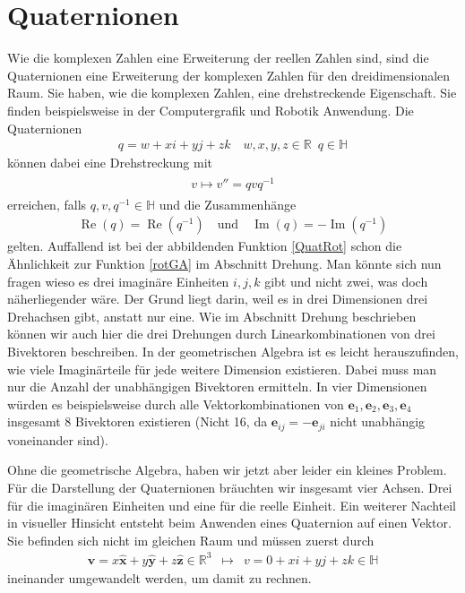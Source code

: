 %
%
%
\section{Quaternionen}

Wie die komplexen Zahlen eine Erweiterung der reellen Zahlen sind, sind die Quaternionen eine Erweiterung der komplexen Zahlen für den dreidimensionalen Raum. Sie haben, wie die komplexen Zahlen, eine drehstreckende Eigenschaft.
Sie finden beispielsweise in der Computergrafik und Robotik Anwendung.
Die Quaternionen
\begin{align}
q = w + xi + yj + zk \quad w,x,y,z \in \mathbb{R}\enspace q \in \mathbb{H}
\end{align}
können dabei eine Drehstreckung mit
\begin{align} \label{QuatRot}
\begin{split} 
v \mapsto v'' = qvq^{-1}
\end{split}
\end{align}
erreichen, falls $q,v,q^{-1} \in \mathbb{H}$ und die Zusammenhänge
\begin{align}
\operatorname{Re}(q) = \operatorname{Re}(q^{-1})\quad\text{und}\quad \operatorname{Im}(q) = -\operatorname{Im}(q^{-1})
\end{align}
gelten. Auffallend ist bei der abbildenden Funktion \eqref{QuatRot} schon die Ähnlichkeit zur Funktion \eqref{rotGA} im Abschnitt Drehung. Man könnte sich nun fragen wieso es drei imaginäre Einheiten $i,j,k$ gibt und nicht zwei, was doch näherliegender wäre. Der Grund liegt darin, weil es in drei Dimensionen drei Drehachsen gibt, anstatt nur eine. Wie im Abschnitt Drehung beschrieben können wir auch hier die drei Drehungen durch Linearkombinationen von drei Bivektoren beschreiben. In der geometrischen Algebra ist es leicht herauszufinden, wie viele Imaginärteile für jede weitere Dimension existieren. Dabei muss man nur die Anzahl der unabhängigen Bivektoren ermitteln. In vier Dimensionen würden es beispielsweise durch alle Vektorkombinationen von $\mathbf{e}_1, \mathbf{e}_2,\mathbf{e}_3, \mathbf{e}_4$ insgesamt 8 Bivektoren existieren (Nicht 16, da $\mathbf{e}_{ij} = -\mathbf{e}_{ji}$ nicht unabhängig voneinander sind).

Ohne die geometrische Algebra, haben wir jetzt aber leider ein kleines Problem. Für die Darstellung der Quaternionen bräuchten wir insgesamt vier Achsen. Drei für die imaginären Einheiten und eine für die reelle Einheit. Ein weiterer Nachteil in visueller Hinsicht entsteht beim Anwenden eines Quaternion auf einen Vektor. Sie befinden sich nicht im gleichen Raum und müssen zuerst durch
\begin{align}
\mathbf{v} = x\mathbf{\hat{x}} + y\mathbf{\hat{y}} + z \mathbf{\hat{z}} \in \mathbb{R}^3 \enspace\mapsto\enspace v = 0 + xi + yj + zk \in \mathbb{H}
\end{align}
ineinander umgewandelt werden, um damit zu rechnen.

